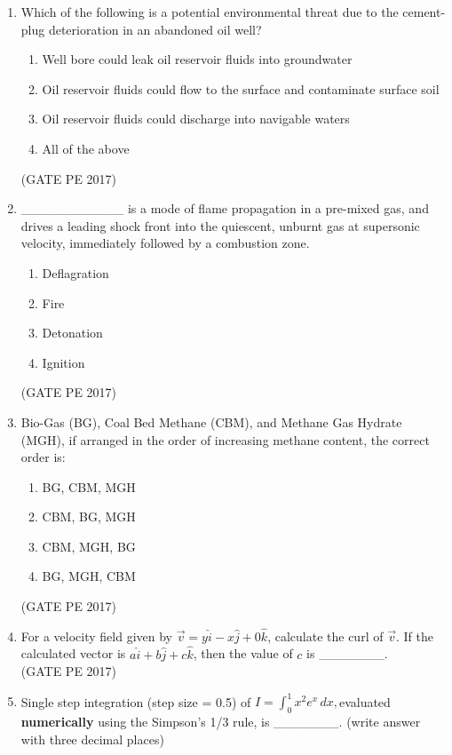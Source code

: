 \documentclass[journal,12pt,onecolumn]{IEEEtran}
\theoremstyle{remark}
\begin{document}
\begin{enumerate}[start=1, label={Q\arabic*.}]
\item Which of the following is a potential environmental threat due to the cement-plug deterioration in an abandoned oil well?
\begin{enumerate}
\item Well bore could leak oil reservoir fluids into groundwater
\item Oil reservoir fluids could flow to the surface and contaminate surface soil
\item Oil reservoir fluids could discharge into navigable waters
\item All of the above
\end{enumerate}
\hfill{(GATE PE 2017)}

\item \_\_\_\_\_\_\_\_\_\_\_ is a mode of flame propagation in a pre-mixed gas, and drives a leading shock front into the quiescent, unburnt gas at supersonic velocity, immediately followed by a combustion zone.
\begin{enumerate}
\item Deflagration
\item Fire
\item Detonation
\item Ignition
\end{enumerate}
\hfill{(GATE PE 2017)}

\item Bio-Gas (BG), Coal Bed Methane (CBM), and Methane Gas Hydrate (MGH), if arranged in the order of increasing methane content, the correct order is:
\begin{enumerate}
\item BG, CBM, MGH
\item CBM, BG, MGH
\item CBM, MGH, BG
\item BG, MGH, CBM
\end{enumerate}
\hfill{(GATE PE 2017)}

\item For a velocity field given by $\vec{v} = y \hat{i} - x \hat{j} + 0 \hat{k}$, calculate the curl of $\vec{v}$. If the calculated vector is $a \hat{i} + b \hat{j} + c \hat{k}$, then the value of $c$ is \_\_\_\_\_\_\_.\\

\hfill{(GATE PE 2017)}

\item Single step integration (step size = 0.5) of $ I = \int_0^1 x^2 e^x \, dx,$evaluated \textbf{numerically} using the Simpson’s 1/3 rule, is \_\_\_\_\_\_\_. (write answer with three decimal places)\\


\end{enumerate}
\end{document}
